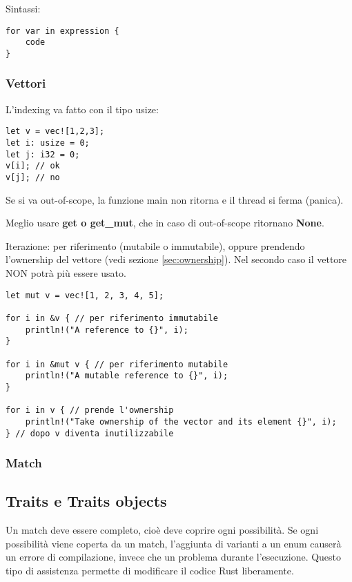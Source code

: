 Sintassi:
\begin{lstlisting}
for var in expression {
    code
}
\end{lstlisting}

\subsubsection{Vettori}

L'indexing va fatto con il tipo usize:

\begin{lstlisting}
let v = vec![1,2,3];
let i: usize = 0;
let j: i32 = 0;
v[i]; // ok
v[j]; // no
\end{lstlisting}

Se si va out-of-scope, la funzione main non ritorna e il thread si ferma
(panica).

Meglio usare \textbf{get o get\_mut}, che in caso di out-of-scope ritornano
\textbf{None}.

Iterazione: per riferimento (mutabile o immutabile), oppure prendendo
l'ownership del vettore (vedi sezione \ref{sec:ownership}). Nel secondo caso
il vettore NON potrà più essere usato.

\begin{lstlisting}
let mut v = vec![1, 2, 3, 4, 5];

for i in &v { // per riferimento immutabile
    println!("A reference to {}", i);
}

for i in &mut v { // per riferimento mutabile
    println!("A mutable reference to {}", i);
}

for i in v { // prende l'ownership
    println!("Take ownership of the vector and its element {}", i);
} // dopo v diventa inutilizzabile
\end{lstlisting}

\subsubsection{Match}

\subsection{Traits e Traits objects}

Un match deve essere completo, cioè deve coprire ogni possibilità.
Se ogni possibilità viene coperta da un match, l’aggiunta di varianti a un
enum causerà un errore di compilazione, invece che un problema durante
l'esecuzione.
Questo tipo di assistenza permette di modificare il codice Rust liberamente.

